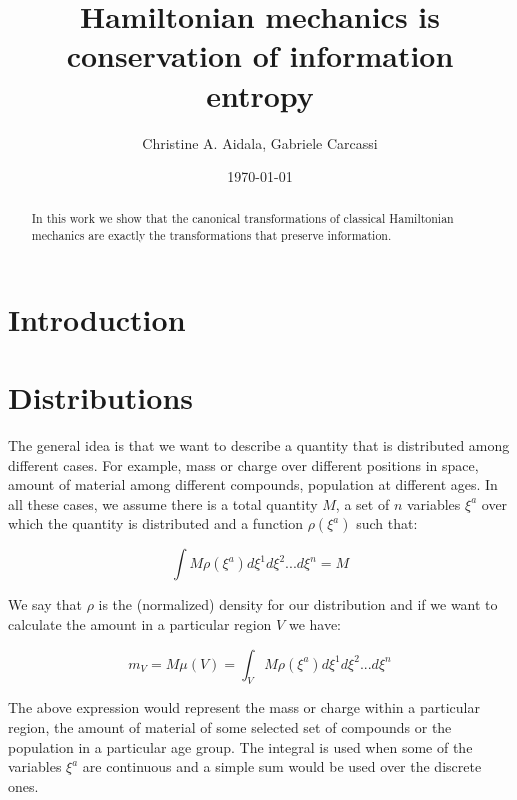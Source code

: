 \documentclass[11pt]{article}
\begin{document}
\title{Hamiltonian mechanics is conservation of information entropy}
\author{Christine A. Aidala, Gabriele Carcassi}



\date{\today}

\maketitle

\begin{abstract}
	In this work we show that the canonical transformations of classical Hamiltonian mechanics are exactly the transformations that preserve information.
\end{abstract}

\tableofcontents
\newpage

\section{Introduction}

\section{Distributions}

The general idea is that we want to describe a quantity that is distributed among different cases. For example, mass or charge over different positions in space, amount of material among different compounds, population at different ages. In all these cases, we assume there is a total quantity $M$, a set of $n$ variables $\xi^a$ over which the quantity is distributed and a function $\rho(\xi^a)$ such that:

\begin{equation}
\int M \rho(\xi^a) d\xi^1 d\xi^2 ... d\xi^n = M
\end{equation}

We say that $\rho$ is the (normalized) density for our distribution and if we want to calculate the amount in a particular region $V$ we have:

\begin{equation}
m_V = M \mu(V) =\int_V M \rho(\xi^a) d\xi^1 d\xi^2 ... d\xi^n
\end{equation}

The above expression would represent the mass or charge within a particular region, the amount of material of some selected set of compounds or the population in a particular age group. The integral is used when some of the variables $\xi^a$ are continuous and a simple sum would be used over the discrete ones.
\end{document}
